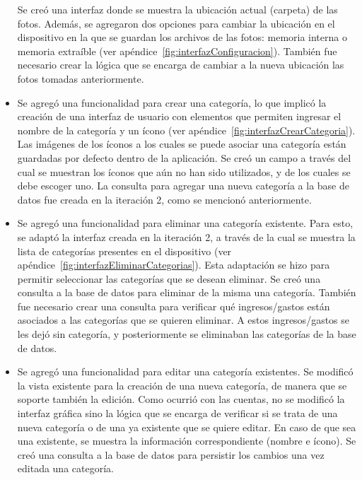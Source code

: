 \begin{itemize}
Se creó una interfaz donde se muestra la ubicación actual (carpeta) de las fotos. Además, se agregaron dos opciones para cambiar la ubicación en el dispositivo en la que se guardan los archivos de las fotos: memoria interna o memoria extraíble (ver apéndice~\ref{fig:interfazConfiguracion}). También fue necesario crear la lógica que se encarga de cambiar a la nueva ubicación las fotos tomadas anteriormente.
\item Se agregó una funcionalidad para crear una categoría, lo que implicó la creación de una interfaz de usuario con elementos que permiten ingresar el nombre de la categoría y un ícono (ver apéndice~\ref{fig:interfazCrearCategoria}). Las imágenes de los íconos a los cuales se puede asociar una categoría están guardadas por defecto dentro de la aplicación. Se creó un campo a través del cual se muestran los íconos que aún no han sido utilizados, y de los cuales se debe escoger uno. La consulta para agregar una nueva categoría a la base de datos fue creada en la iteración 2, como se mencionó anteriormente.
\item Se agregó una funcionalidad para eliminar una categoría existente. Para esto, se adaptó la interfaz creada en la iteración 2, a través de la cual se muestra la lista de categorías presentes en el dispositivo (ver apéndice~\ref{fig:interfazEliminarCategorias}). Esta adaptación se hizo para permitir seleccionar las categorías que se desean eliminar. Se creó una consulta a la base de datos para eliminar de la misma una categoría. También fue necesario crear una consulta para verificar qué ingresos/gastos están asociados a las categorías que se quieren eliminar. A estos ingresos/gastos se les dejó sin categoría, y posteriormente se eliminaban las categorías de la base de datos.

\item Se agregó una funcionalidad para editar una categoría existentes. Se modificó la vista existente para la creación de una nueva categoría, de manera que se soporte también la edición. Como ocurrió con las cuentas, no se modificó la interfaz gráfica sino la lógica que se encarga de verificar si se trata de una nueva categoría o de una ya existente que se quiere editar. En caso de que sea una existente, se muestra la información correspondiente (nombre e ícono). Se creó una consulta a la base de datos para persistir los cambios una vez editada una categoría.
\end{itemize}

